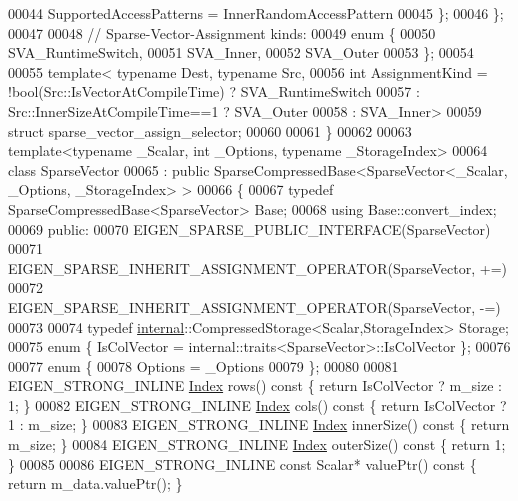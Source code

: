\begin{DoxyCode}
00044     SupportedAccessPatterns = InnerRandomAccessPattern
00045   \};
00046 \};
00047 
00048 \textcolor{comment}{// Sparse-Vector-Assignment kinds:}
00049 \textcolor{keyword}{enum} \{
00050   SVA\_RuntimeSwitch,
00051   SVA\_Inner,
00052   SVA\_Outer
00053 \};
00054 
00055 \textcolor{keyword}{template}< \textcolor{keyword}{typename} Dest, \textcolor{keyword}{typename} Src,
00056           \textcolor{keywordtype}{int} AssignmentKind = !bool(Src::IsVectorAtCompileTime) ? SVA\_RuntimeSwitch
00057                              : Src::InnerSizeAtCompileTime==1 ? SVA\_Outer
00058                              : SVA\_Inner>
00059 \textcolor{keyword}{struct }sparse\_vector\_assign\_selector;
00060 
00061 \}
00062 
00063 \textcolor{keyword}{template}<\textcolor{keyword}{typename} \_Scalar, \textcolor{keywordtype}{int} \_Options, \textcolor{keyword}{typename} \_StorageIndex>
00064 \textcolor{keyword}{class }SparseVector
00065   : \textcolor{keyword}{public} SparseCompressedBase<SparseVector<\_Scalar, \_Options, \_StorageIndex> >
00066 \{
00067     \textcolor{keyword}{typedef} SparseCompressedBase<SparseVector> Base;
00068     \textcolor{keyword}{using} Base::convert\_index;
00069   \textcolor{keyword}{public}:
00070     EIGEN\_SPARSE\_PUBLIC\_INTERFACE(SparseVector)
00071     EIGEN\_SPARSE\_INHERIT\_ASSIGNMENT\_OPERATOR(SparseVector, +=)
00072     EIGEN\_SPARSE\_INHERIT\_ASSIGNMENT\_OPERATOR(SparseVector, -=)
00073     
00074     typedef \hyperlink{namespaceinternal}{internal}::CompressedStorage<Scalar,StorageIndex> Storage;
00075     enum \{ IsColVector = internal::traits<SparseVector>::IsColVector \};
00076     
00077     \textcolor{keyword}{enum} \{
00078       Options = \_Options
00079     \};
00080     
00081     EIGEN\_STRONG\_INLINE \hyperlink{namespace_eigen_a62e77e0933482dafde8fe197d9a2cfde}{Index} rows()\textcolor{keyword}{ const }\{ \textcolor{keywordflow}{return} IsColVector ? m\_size : 1; \}
00082     EIGEN\_STRONG\_INLINE \hyperlink{namespace_eigen_a62e77e0933482dafde8fe197d9a2cfde}{Index} cols()\textcolor{keyword}{ const }\{ \textcolor{keywordflow}{return} IsColVector ? 1 : m\_size; \}
00083     EIGEN\_STRONG\_INLINE \hyperlink{namespace_eigen_a62e77e0933482dafde8fe197d9a2cfde}{Index} innerSize()\textcolor{keyword}{ const }\{ \textcolor{keywordflow}{return} m\_size; \}
00084     EIGEN\_STRONG\_INLINE \hyperlink{namespace_eigen_a62e77e0933482dafde8fe197d9a2cfde}{Index} outerSize()\textcolor{keyword}{ const }\{ \textcolor{keywordflow}{return} 1; \}
00085 
00086     EIGEN\_STRONG\_INLINE \textcolor{keyword}{const} Scalar* valuePtr()\textcolor{keyword}{ const }\{ \textcolor{keywordflow}{return} m\_data.valuePtr(); \}

\end{DoxyCode}
